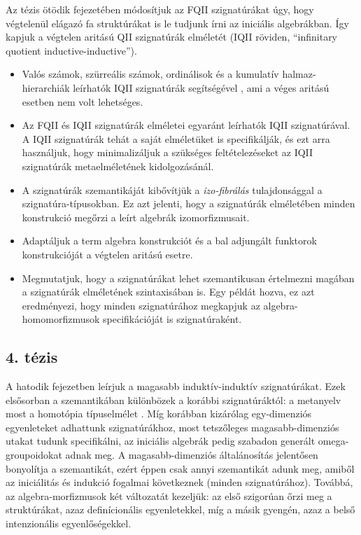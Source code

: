 \documentclass[12pt]{article}
\begin{document}
Az tézis ötödik fejezetében módosítjuk az FQII szignatúrákat úgy, hogy
végtelenül elágazó fa struktúrákat is le tudjunk írni az iniciális
algebrákban. Így kapjuk a végtelen aritású QII szignatúrák elméletét (IQII
röviden, ``infinitary quotient inductive-inductive'').
\begin{itemize}
\item Valós számok, szürreális számok, ordinálisok és a kumulatív halmaz-hierarchiák
  leírhatók IQII szignatúrák segítségével \cite{hottbook}, ami a véges aritású
  esetben nem volt lehetséges.
\item
  Az FQII és IQII szignatúrák elméletei egyaránt leírhatók IQII szignatúrával.
  A IQII szignatúrák tehát a saját elméletüket is specifikálják, és ezt arra használjuk,
  hogy minimalizáljuk a szükséges feltételezéseket az IQII szignatúrák metaelméletének
  kidolgozásánál.
\item
  A szignatúrák szemantikáját kibővítjük a \emph{izo-fibrálás} tulajdonsággal a
  szignatúra-típusokban. Ez azt jelenti, hogy a szignatúrák elméletében minden
  konstrukció megőrzi a leírt algebrák izomorfizmusait.
\item
  Adaptáljuk a term algebra konstrukciót és a bal adjungált funktorok konstrukcióját
  a végtelen aritású esetre.
\item
  Megmutatjuk, hogy a szignatúrákat lehet szemantikusan értelmezni magában a
  szignatúrák elméletének szintaxisában is. Egy példát hozva, ez azt
  eredményezi, hogy minden szignatúrához megkapjuk az algebra-homomorfizmusok
  specifikációját is szignatúraként.
\end{itemize}

\subsection*{4. tézis}
A hatodik fejezetben leírjuk a magasabb induktív-induktív szignatúrákat. Ezek
elsősorban a szemantikában különbözek a korábbi szignatúráktól: a metanyelv most
a homotópia típuselmélet \cite{hottbook}. Míg korábban kizárólag egy-dimenziós
egyenleteket adhattunk szignatúrákhoz, most tetszőleges magasabb-dimenziós
utakat tudunk specifikálni, az iniciális algebrák pedig szabadon generált
omega-groupoidokat adnak meg. A magasabb-dimenziós általánosítás jelentősen
bonyolítja a szemantikát, ezért éppen csak annyi szemantikát adunk meg, amiből
az iniciálitás és indukció fogalmai következnek (minden szignatúrához). Továbbá,
az algebra-morfizmusok két változatát kezeljük: az első szigorúan őrzi meg a
struktúrákat, azaz definícionális egyenletekkel, míg a másik gyengén, azaz
a belső intenzionális egyenlőségekkel.
\end{document}
